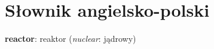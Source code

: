 \documentclass{createspace}
\begin{document}
\appendix
\chapter{Słownik angielsko-polski}
\begin{compactitem}
\item \textbf{reactor}: reaktor (\emph{nuclear}: jądrowy)
\end{compactitem}

\raggedright



\printindex

\printindex[persons]
\end{document}
